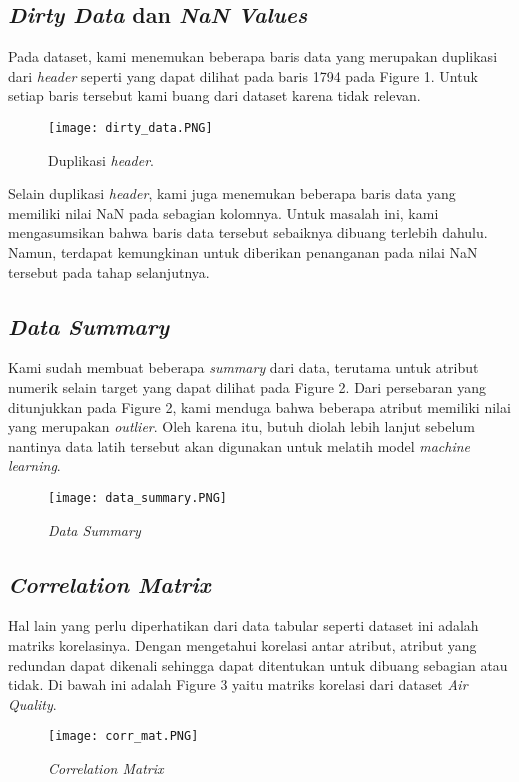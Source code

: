 \documentclass{article}
\begin{document}
\begin{normalsize}
        \subsection{\textit{Dirty Data} dan \textit{NaN Values}}
        Pada dataset, kami menemukan beberapa baris data yang merupakan duplikasi dari \textit{header}
        seperti yang dapat dilihat pada baris 1794 pada Figure 1. Untuk setiap baris tersebut kami buang
        dari dataset karena tidak relevan.

        \begin{figure}[h!]
            \centering
            \texttt{[image: dirty\_data.PNG]}
            \caption{Duplikasi \textit{header}.}
            \label{fig:dirty_data}
        \end{figure}

        \noindent Selain duplikasi \textit{header}, kami juga menemukan beberapa baris data yang memiliki nilai NaN
        pada sebagian kolomnya. Untuk masalah ini, kami mengasumsikan bahwa baris data tersebut sebaiknya
        dibuang terlebih dahulu. Namun, terdapat kemungkinan untuk diberikan penanganan pada nilai NaN 
        tersebut pada tahap selanjutnya.

        \subsection{\textit{Data Summary}}
        Kami sudah membuat beberapa \textit{summary} dari data, terutama untuk atribut numerik selain target yang
        dapat dilihat pada Figure 2. Dari persebaran yang ditunjukkan pada Figure 2, kami menduga bahwa beberapa 
        atribut memiliki nilai yang merupakan \textit{outlier}. Oleh karena itu, butuh diolah lebih lanjut sebelum
        nantinya data latih tersebut akan digunakan untuk melatih model \textit{machine learning}.
        \begin{figure}[h!]
            \centering
            \texttt{[image: data\_summary.PNG]}
            \caption{\textit{Data Summary}}
            \label{fig:data_summary}
        \end{figure}

        \subsection{\textit{Correlation Matrix}}
        Hal lain yang perlu diperhatikan dari data tabular seperti dataset ini adalah matriks korelasinya. Dengan
        mengetahui korelasi antar atribut, atribut yang redundan dapat dikenali sehingga dapat ditentukan untuk 
        dibuang sebagian atau tidak. Di bawah ini adalah Figure 3 yaitu matriks korelasi dari dataset \textit{Air Quality}.
        \begin{figure}[h!]
            \centering
            \texttt{[image: corr\_mat.PNG]}
            \caption{\textit{Correlation Matrix}}
            \label{fig:corr_mat}
        \end{figure}


\end{normalsize}
\end{document}

